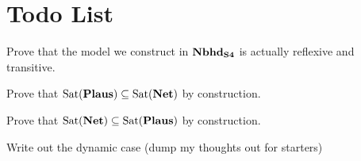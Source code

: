 \documentclass[letterpaper]{article}
\begin{document}
\section*{Todo List}
\begin{todolist}
    \item Prove that the model we construct in $\textrm{\textbf{Nbhd}}_\textrm{\textbf{S4}}$ is actually reflexive and transitive.
    \item Prove that $\mathrm{Sat}( \textrm{\textbf{Plaus}} ) \subseteq \mathrm{Sat}( \textrm{\textbf{Net}} )$ by construction.
    \item Prove that $\mathrm{Sat}( \textrm{\textbf{Net}} ) \subseteq \mathrm{Sat}( \textrm{\textbf{Plaus}} )$ by construction.
    \item Write out the dynamic case (dump my thoughts out for starters)
\end{todolist}





\printbibliography
\end{document}
